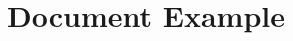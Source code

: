 \documentclass{article}
\title{Document Example}
\begin{document}
\makecover
\maketitle
\end{document}
